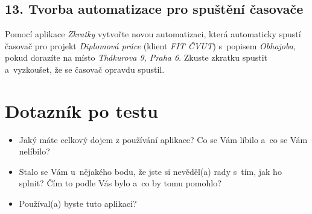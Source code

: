 \subsection*{13. Tvorba automatizace pro spuštění časovače}

Pomocí aplikace \emph{Zkratky} vytvořte novou automatizaci, která automaticky spustí časovač pro projekt \emph{Diplomová práce} (klient \emph{FIT ČVUT}) s~popisem \emph{Obhajoba}, pokud dorazíte na místo \emph{Thákurova 9, Praha 6}. Zkuste zkratku spustit a~vyzkoušet, že se časovač opravdu spustil.

\section*{Dotazník po testu}
\begin{itemize}
\item Jaký máte celkový dojem z používání aplikace? Co se Vám líbilo a~co se Vám nelíbilo?
\item Stalo se Vám u~nějakého bodu, že jste si nevěděl(a) rady s~tím, jak ho splnit? Čím to podle Vás bylo a~co by tomu pomohlo?
\item Používal(a) byste tuto aplikaci?
\end{itemize}
